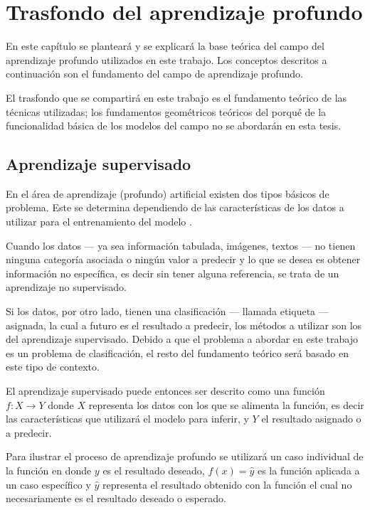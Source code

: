 
\chapter{Trasfondo del aprendizaje profundo} %

\label{Chapter2} %

En este capítulo se planteará y se explicará la base teórica del campo del aprendizaje profundo utilizados en este trabajo. Los conceptos descritos a continuación son el fundamento del campo de aprendizaje profundo.

El trasfondo que se compartirá en este trabajo es el fundamento teórico de las técnicas utilizadas; los fundamentos geométricos teóricos \parencite{2018leigeometric} del porqué de la funcionalidad básica de los modelos del campo no se abordarán en esta tesis.

\section{Aprendizaje supervisado}

En el área de aprendizaje (profundo) artificial existen dos tipos básicos de problema. Este se determina dependiendo de las características de los datos a utilizar para el entrenamiento del modelo \parencite{schmidhuber2015deep}.

Cuando los datos --- ya sea información tabulada, imágenes, textos --- no tienen ninguna categoría asociada o ningún valor a predecir y lo que se desea es obtener información no específica, es decir sin tener alguna referencia, se trata de un aprendizaje no supervisado.

Si los datos, por otro lado, tienen una clasificación  --- llamada etiqueta --- asignada, la cual a futuro es el resultado a predecir, los métodos a utilizar son los del aprendizaje supervisado. Debido a que el problema a abordar en este trabajo es un problema de clasificación, el resto del fundamento teórico será basado en este tipo de contexto.

El aprendizaje supervisado puede entonces ser descrito como una función $f : X \to Y$ donde $X$ representa los datos con los que se alimenta la función, es decir las características que utilizará el modelo para inferir, y $Y$ el resultado asignado o a predecir.

Para ilustrar el proceso de aprendizaje profundo se utilizará un caso individual de la función en donde $y$ es el resultado deseado, $f(x) = \hat{y}$ es la función aplicada a un caso específico y $\hat{y}$ representa el resultado obtenido con la función el cual no necesariamente es el resultado deseado o esperado.

